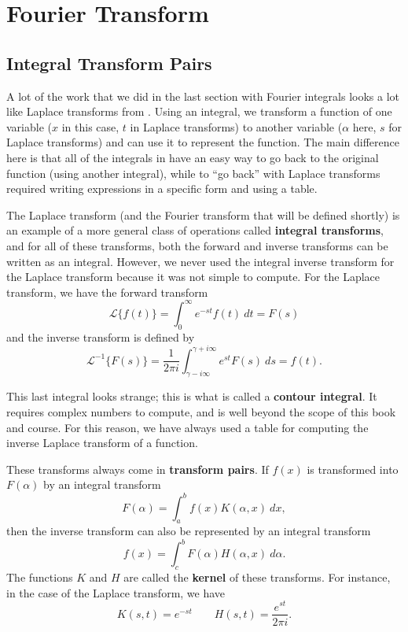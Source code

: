 \section{Fourier Transform}
\label{fourierTransform:section}



\subsection{Integral Transform Pairs}

A lot of the work that we did in the last section with Fourier integrals looks a lot like Laplace transforms from . Using an integral, we transform a function of one variable ($x$ in this case, $t$ in Laplace transforms) to another variable ($\alpha$ here, $s$ for Laplace transforms) and can use it to represent the function. The main difference here is that all of the integrals in  have an easy way to go back to the original function (using another integral), while to ``go back'' with Laplace transforms required writing expressions in a specific form and using a table.

The Laplace transform (and the Fourier transform that will be defined shortly) is an example of a more general class of operations called \textbf{integral transforms}, and for all of these transforms, both the forward and inverse transforms can be written as an integral. However, we never used the integral inverse transform for the Laplace transform because it was not simple to compute. For the Laplace transform, we have the forward transform
\[ \mathcal{L}\{f(t)\} = \int_0^\infty e^{-st} f(t)\ dt = F(s) \] and the inverse transform is defined by
\[ \mathcal{L}^{-1}\{F(s)\} = \frac{1}{2\pi i} \int_{\gamma - i\infty}^{\gamma +i\infty} e^{st}F(s)\ ds = f(t). \]

This last integral looks strange; this is what is called a \textbf{contour integral}. It requires complex numbers to compute, and is well beyond the scope of this book and course. For this reason, we have always used a table for computing the inverse Laplace transform of a function. 

These transforms always come in \textbf{transform pairs}. If $f(x)$ is transformed into $F(\alpha)$ by an integral transform
\[ F(\alpha) = \int_a^b f(x)K(\alpha, x)\ dx, \] then the inverse transform can also be represented by an integral transform
\[ f(x) = \int_c^b F(\alpha)H(\alpha, x)\ d\alpha. \] The functions $K$ and $H$ are called the \textbf{kernel} of these transforms. For instance, in the case of the Laplace transform, we have
\[ K(s, t) = e^{-st} \qquad H(s,t) = \frac{e^{st}}{2\pi i}. \]

